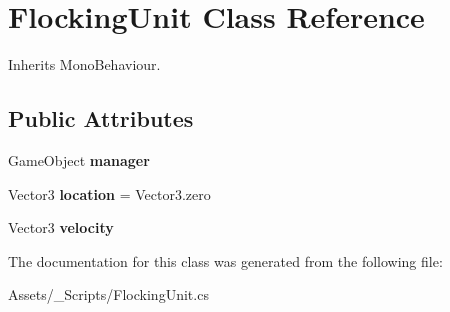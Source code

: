 \hypertarget{class_flocking_unit}{}\section{Flocking\+Unit Class Reference}
\label{class_flocking_unit}


Inherits Mono\+Behaviour.

\subsection*{Public Attributes}
\begin{DoxyCompactItemize}
\item 
\mbox{\label{class_flocking_unit_ad7beefab4a6c0b845680c8285830664c}} 
Game\+Object {\bfseries manager}
\item 
\mbox{\label{class_flocking_unit_ac445c57b9d14ea22bf29b17535146b2f}} 
Vector3 {\bfseries location} = Vector3.\+zero
\item 
\mbox{\label{class_flocking_unit_a3d36c8d4d4517d74712808bf0cd4390e}} 
Vector3 {\bfseries velocity}
\end{DoxyCompactItemize}


The documentation for this class was generated from the following file\+:\begin{DoxyCompactItemize}
\item 
Assets/\+\_\+\+Scripts/Flocking\+Unit.\+cs\end{DoxyCompactItemize}
